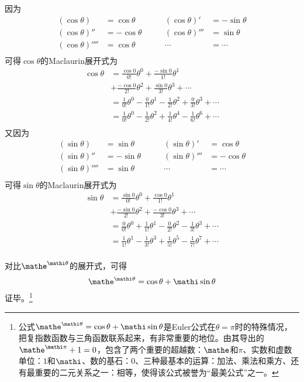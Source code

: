 因为
\begin{align*}
  (\cos\theta) &= \cos\theta \qquad& (\cos\theta)' &= -\sin\theta \\
  (\cos\theta)'' &= -\cos\theta \qquad& (\cos\theta)''' &= \sin\theta \\
  (\cos\theta)'''' &= \cos\theta \qquad& \cdots &= \cdots \\
\end{align*}
可得$\cos\theta$的Maclaurin展开式为
\begin{align*}
  \cos\theta &= \frac{\cos0}{0!}\theta^0 + \frac{-\sin0}{1!}\theta^1 \\
  &+ \frac{-\cos0}{2!}\theta^2 + \frac{\sin0}{3!}\theta^3 + \cdots \\
  &= \frac1{0!}\theta^0 - \frac0{1!}\theta^1 - \frac1{2!}\theta^2 + \frac0{3!}\theta^3 + \cdots \\
  &= \frac1{0!}\theta^0 - \frac1{2!}\theta^2 + \frac1{4!}\theta^4 - \frac1{6!}\theta^6 + \cdots \\
\end{align*}
又因为
\begin{align*}
  (\sin\theta) &= \sin\theta \qquad& (\sin\theta)' &= \cos\theta \\
  (\sin\theta)'' &= -\sin\theta \qquad& (\sin\theta)''' &= -\cos\theta \\
  (\sin\theta)'''' &= \sin\theta \qquad& \cdots &= \cdots \\
\end{align*}
可得$\sin\theta$的Maclaurin展开式为
\begin{align*}
  \sin\theta &= \frac{\sin0}{0!}\theta^0 + \frac{\cos0}{1!}\theta^1 \\
  &+ \frac{-\sin0}{2!}\theta^2 + \frac{-\cos0}{3!}\theta^3 + \cdots \\
  &= \frac0{0!}\theta^0 + \frac1{1!}\theta^1 - \frac0{2!}\theta^2 - \frac1{3!}\theta^3 + \cdots \\
  &= \frac1{1!}\theta^1 - \frac1{3!}\theta^3 + \frac1{5!}\theta^5 - \frac1{7!}\theta^7 + \cdots \\
\end{align*}

对比$\mathe^{\mathi\theta}$的展开式，可得
\[ \mathe^{\mathi\theta} = \cos\theta + \mathi\sin\theta \]
证毕。\footnote{公式$\mathe^{\mathi\theta} = \cos\theta + \mathi\sin\theta$是Euler公式在$\theta = \pi$时的特殊情况，把复指数函数与三角函数联系起来，有非常重要的地位。由其导出的$\mathe^{\mathi\pi} + 1 = 0$，包含了两个重要的超越数：$\mathe$和$\pi$、实数和虚数单位：$1$和$\mathi$、数的基石：$0$、三种最基本的运算：加法、乘法和乘方、还有最重要的二元关系之一：相等，使得该公式被誉为“最美公式”之一。}
